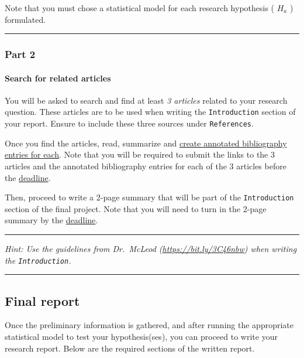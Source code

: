 \documentclass[
]{article}
\begin{document}
Note that you must chose a statistical model for each research hypothesis ( \(H_a\) ) formulated.

\begin{center}\rule{0.5\linewidth}{0.5pt}\end{center}

\hypertarget{part-2}{%
\subsubsection{Part 2}\label{part-2}}

\hypertarget{articles}{%
\paragraph{Search for related articles}\label{articles}}

You will be asked to search and find at least \emph{3 articles} related to your research question. These articles are to be used when writing the \texttt{Introduction} section of your report. Ensure to include these three sources under \texttt{References}.

Once you find the articles, read, summarize and \href{https://bit.ly/2YIGK2t}{create annotated bibliography entries for each}. Note that you will be required to submit the links to the 3 articles and the annotated bibliography entries for each of the 3 articles before the \protect\hyperlink{deadlines}{deadline}.

Then, proceed to write a 2-page summary that will be part of the \texttt{Introduction} section of the final project. Note that you will need to turn in the 2-page summary by the \protect\hyperlink{deadlines}{deadline}.

\begin{center}\rule{0.5\linewidth}{0.5pt}\end{center}

\emph{Hint: Use the guidelines from Dr.~McLeod (\url{https://bit.ly/3C46nbw}) when writing the \texttt{Introduction}.}

\begin{center}\rule{0.5\linewidth}{0.5pt}\end{center}

\hypertarget{final-report}{%
\subsection{Final report}\label{final-report}}

Once the preliminary information is gathered, and after running the appropriate statistical model to test your hypothesis(ses), you can proceed to write your research report. Below are the required sections of the written report.
\end{document}
